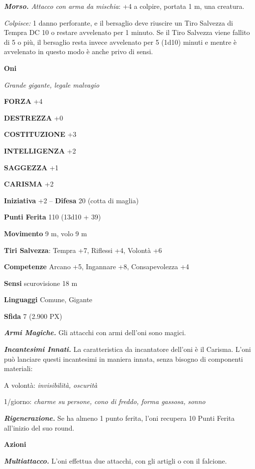 \begin{multicols}{2}
\textit{\textbf{Morso.} Attacco con arma da mischia}: +4 a colpire, portata 1 m, una creatura.

\textit{Colpisce:} 1 danno perforante, e il bersaglio deve riuscire un Tiro Salvezza di Tempra DC 10 o restare avvelenato per 1 minuto. Se il Tiro Salvezza viene fallito di 5 o più, il bersaglio resta invece avvelenato per 5 (1d10) minuti e mentre è avvelenato in questo modo è anche privo di sensi.

\medskip{}\textbf{Oni}

\textit{Grande gigante, legale malvagio}

\textbf{FORZA} +4

\textbf{DESTREZZA} +0

\textbf{COSTITUZIONE} +3

\textbf{INTELLIGENZA} +2

\textbf{SAGGEZZA} +1

\textbf{CARISMA} +2

\textbf{Iniziativa} +2 -- \textbf{Difesa} 20 (cotta di maglia)

\textbf{Punti Ferita} 110 (13d10 + 39)

\textbf{Movimento} 9 m, volo 9 m

\textbf{Tiri Salvezza}: Tempra +7, Riflessi +4, Volontà +6

\textbf{Competenze} Arcano +5, Ingannare +8, Consapevolezza +4

\textbf{Sensi} scurovisione 18 m

\textbf{Linguaggi} Comune, Gigante

\textbf{Sfida} 7 (2.900 PX)

\textit{\textbf{Armi Magiche.}} Gli attacchi con armi dell'oni sono magici.

\textit{\textbf{Incantesimi Innati.}} La caratteristica da incantatore dell'oni è il Carisma. L'oni può lanciare questi incantesimi in maniera innata, senza bisogno di componenti materiali:

A volontà: \textit{invisibilità, oscurità}

1/giorno: \textit{charme su persone, cono di freddo, forma gassosa,}
\textit{sonno}

\textit{\textbf{Rigenerazione.}} Se ha almeno 1 punto ferita, l'oni recupera 10 Punti Ferita all'inizio del suo round.

\textbf{Azioni}

\textit{\textbf{Multiattacco.}} L'oni effettua due attacchi, con gli artigli o con il falcione.


\end{multicols}
